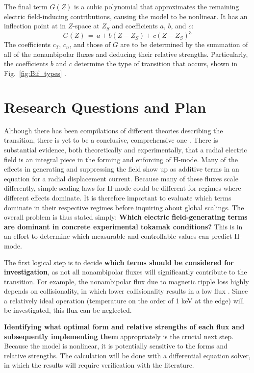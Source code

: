 \documentclass[a4paper]{article}
\begin{document}
The final term $G(Z)$ is a cubic polynomial that approximates the remaining electric field-inducing contributions, causing the model to be nonlinear.
It has an inflection point at in $Z$-space at $Z_S$ and coefficients $a$, $b$, and $c$:
\begin{equation}
	G(Z) \,=\, a + b(Z - Z_S) + c(Z - Z_S)^3
\end{equation}
The coefficients $c_T$, $c_n$, and those of $G$ are to be determined by the summation of all of the nonambipolar fluxes and deducing their relative strengths.
Particularly, the coefficients $b$ and $c$ determine the type of transition that occurs, shown in Fig.~\ref{fig:Bif_types} \cite{staps_backstepping_2017}.


\section{Research Questions and Plan}
Although there has been compilations of different theories describing the transition, there is yet to be a conclusive, comprehensive one \cite{connor_review_2000}.
There is substantial evidence, both theoretically and experimentally, that a radial electric field is an integral piece in the forming and enforcing of H-mode.
Many of the effects in generating and suppressing the field show up as additive terms in an equation for a radial displacement current.
Because many of these fluxes scale differently, simple scaling laws for H-mode could be different for regimes where different effects dominate.
It is therefore important to evaluate which terms dominate in their respective regimes before inquiring about global scalings.
The overall problem is thus stated simply: \textbf{Which electric field-generating terms are dominant in concrete experimental tokamak conditions?}
This is in an effort to determine which measurable and controllable values can predict H-mode.

The first logical step is to decide \textbf{which terms should be considered for investigation}, as not all nonambipolar fluxes will significantly contribute to the transition.
For example, the nonambipolar flux due to magnetic ripple loss highly depends on collisionality, in which lower collisionality results in a low flux \cite{stringer_effect_1972}.
Since a relatively ideal operation (temperature on the order of 1 keV at the edge) will be investigated, this flux can be neglected.

\textbf{Identifying what optimal form and relative strengths of each flux and subsequently implementing them} appropriately is the crucial next step.
Because the model is nonlinear, it is potentially sensitive to the forms and relative strengths.
The calculation will be done with a differential equation solver, in which the results will require verification with the literature.
\end{document}
